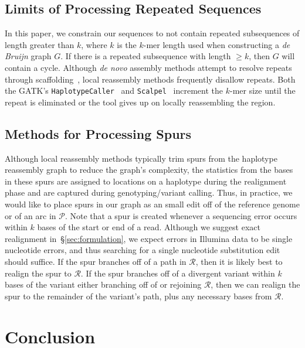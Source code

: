 \documentclass[11pt]{article}
\begin{document}
\subsection{Limits of Processing Repeated Sequences}
\label{sec:limits-repeated-sequences}

In this paper, we constrain our sequences to not contain repeated subsequences of length greater than
$k$, where $k$ is the $k$-mer length used when constructing a \emph{de Bruijn} graph $G$. If there is a repeated 
subsequence with length $\ge k$, then $G$ will contain a cycle. Although \emph{de novo} assembly
methods attempt to resolve repeats through scaffolding~\cite{zerbino09}, local reassembly methods
frequently disallow repeats. Both the GATK's \texttt{HaplotypeCaller}~\cite{depristo11} and
\texttt{Scalpel}~\cite{narzisi14} increment the $k$-mer size until the repeat is eliminated or the tool
gives up on locally reassembling the region.

\subsection{Methods for Processing Spurs}
\label{sec:spurs}

Although local reassembly methods typically trim spurs from the haplotype reassembly graph to reduce
the graph's complexity, the statistics from the bases in these spurs are assigned to locations on a
haplotype during the realignment phase and are captured during genotyping/variant calling. Thus, in
practice, we would like to place spurs in our graph as an small edit off of the reference genome or of an
arc in $\mathcal{P}$. Note that a spur is created whenever a sequencing error occurs within $k$ bases of
the start or end of a read. Although we suggest exact realignment in~\S\ref{sec:formulation}, we expect
errors in Illumina data to be single nucleotide errors, and thus searching for a single nucleotide
substitution edit should suffice. If the spur branches off of a path in $\mathcal{R}$, then it is likely best to
realign the spur to $\mathcal{R}$. If the spur branches off of a divergent variant within $k$ bases of the
variant either branching off of or rejoining $\mathcal{R}$, then we can realign the spur to the remainder of
the variant's path, plus any necessary bases from $\mathcal{R}$.

\section{Conclusion}
\label{sec:conclusion}
\end{document}

